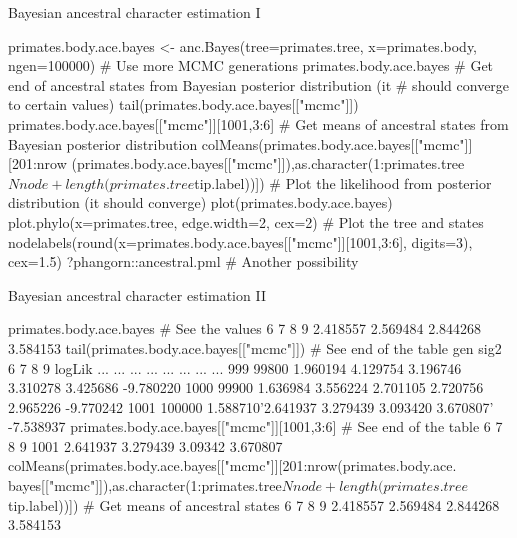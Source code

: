 \documentclass[compress, ucs, xelatex, 11pt, xcolor=svgnames, aspectratio=169,
	hyperref={
		bookmarks=true,
		unicode=true,
		colorlinks=true,
		pdftitle={Molecular data in R},
		plainpages=false,
		pdfauthor={Vojtech Zeisek},
		pdfsubject={Course about phylogeny and evolution in R},
		pdfcreator={XeLaTeX},
		pdfkeywords={R, evolution, phylogeny, molecular data},
		linkcolor=Crimson, %
		anchorcolor=Magenta, %
		citecolor=Magenta, %
		filecolor=Magenta, %
		menucolor=Magenta, %
		urlcolor=DodgerBlue, %
		pdftex},
	url={hyphens, lowtilde} %
	]{beamer}
\begin{document}
\begin{frame}[fragile]{Bayesian ancestral character estimation I}
	\begin{spluscode}
    primates.body.ace.bayes <- anc.Bayes(tree=primates.tree, x=primates.body,
      ngen=100000) # Use more MCMC generations
    primates.body.ace.bayes
    # Get end of ancestral states from Bayesian posterior distribution (it
    # should converge to certain values)
    tail(primates.body.ace.bayes[["mcmc"]])
    primates.body.ace.bayes[["mcmc"]][1001,3:6]
    # Get means of ancestral states from Bayesian posterior distribution
    colMeans(primates.body.ace.bayes[["mcmc"]][201:nrow
      (primates.body.ace.bayes[["mcmc"]]),as.character(1:primates.tree
      $Nnode+length(primates.tree$tip.label))])
    # Plot the likelihood from posterior distribution (it should converge)
    plot(primates.body.ace.bayes)
    plot.phylo(x=primates.tree, edge.width=2, cex=2) # Plot the tree and states
    nodelabels(round(x=primates.body.ace.bayes[["mcmc"]][1001,3:6], digits=3),
      cex=1.5)
    ?phangorn::ancestral.pml # Another possibility
	\end{spluscode}
\end{frame}

\begin{frame}[fragile]{Bayesian ancestral character estimation II}
	\begin{spluscode}
    primates.body.ace.bayes # See the values
           6        7        8        9
    2.418557 2.569484 2.844268 3.584153
    tail(primates.body.ace.bayes[["mcmc"]]) # See end of the table
            gen     sig2        6        7        8        9     logLik
     ...    ...      ...      ...      ...      ...      ...        ...
     999  99800 1.960194 4.129754 3.196746 3.310278 3.425686  -9.780220
    1000  99900 1.636984 3.556224 2.701105 2.720756 2.965226  -9.770242
    1001 100000 1.588710'2.641937 3.279439 3.093420 3.670807' -7.538937
    primates.body.ace.bayes[["mcmc"]][1001,3:6] # See end of the table
                6        7       8        9
    1001 2.641937 3.279439 3.09342 3.670807
    colMeans(primates.body.ace.bayes[["mcmc"]][201:nrow(primates.body.ace.
      bayes[["mcmc"]]),as.character(1:primates.tree$Nnode+length
      (primates.tree$tip.label))]) # Get means of ancestral states
           6        7        8        9
    2.418557 2.569484 2.844268 3.584153
	\end{spluscode}
\end{frame}
\end{document}
